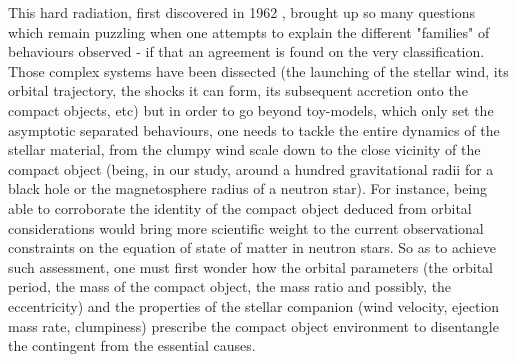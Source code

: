 \documentclass[
    a4paper, 
    12pt, onecolumn,
]{article}
\begin{document}
\indent This hard radiation, first discovered in 1962 \citep{Giacconi1962}, brought up so many questions which remain puzzling when one attempts to explain the different "families" of behaviours observed - if that an agreement is found on the very classification. Those complex systems have been dissected (the launching of the stellar wind, its orbital trajectory, the shocks it can form, its subsequent accretion onto the compact objects, etc) but in order to go beyond toy-models, which only set the asymptotic separated behaviours, one needs to tackle the entire dynamics of the stellar material, from the clumpy wind scale down to the close vicinity of the compact object (being, in our study, around a hundred gravitational radii for a black hole or the magnetosphere radius of a neutron star). For instance, being able to corroborate the identity of the compact object deduced from orbital considerations would bring more scientific weight to the current observational constraints on the equation of state of matter in neutron stars. So as to achieve such assessment, one must first wonder how the orbital parameters (the orbital period, the mass of the compact object, the mass ratio and possibly, the eccentricity) and the properties of the stellar companion (wind velocity, ejection mass rate, clumpiness) prescribe the compact object environment to disentangle the contingent from the essential causes.\\
\end{document}

